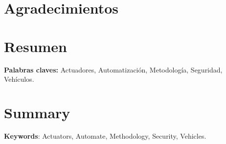\documentclass[12pt]{article}
\begin{document}


\clearpage
\section*{\centering Agradecimientos}




\clearpage
\section*{\centering Resumen}


\textbf{Palabras claves:} Actuadores, Automatización, Metodología, Seguridad, Vehículos.



\clearpage
\section*{\centering Summary}

\textbf{Keywords}: Actuators, Automate, Methodology, Security, Vehicles.


\clearpage
{}
\renewcommand\contentsname{Índice}
\tableofcontents



\clearpage
{}
\setcounter{page}{1}



\clearpage


\clearpage


\clearpage

\end{document}
